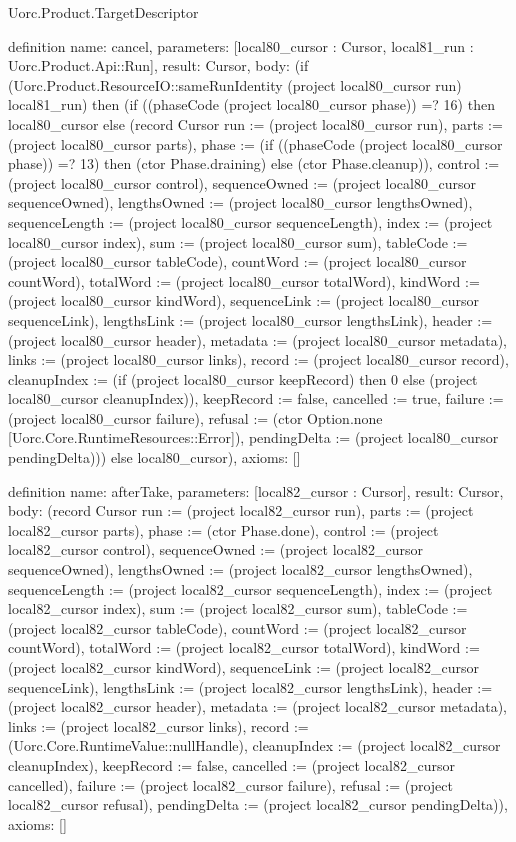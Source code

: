 \begin{lexlean}{Uorc.Product.TargetDescriptor}
\begin{semanticmodule}
definition{
  name: cancel,
  parameters: [local80_cursor : Cursor, local81_run : Uorc.Product.Api::Run],
  result: Cursor,
  body: (if (Uorc.Product.ResourceIO::sameRunIdentity (project local80_cursor run) local81_run) then (if ((phaseCode (project local80_cursor phase)) =? 16) then local80_cursor else (record Cursor {run := (project local80_cursor run), parts := (project local80_cursor parts), phase := (if ((phaseCode (project local80_cursor phase)) =? 13) then (ctor Phase.draining) else (ctor Phase.cleanup)), control := (project local80_cursor control), sequenceOwned := (project local80_cursor sequenceOwned), lengthsOwned := (project local80_cursor lengthsOwned), sequenceLength := (project local80_cursor sequenceLength), index := (project local80_cursor index), sum := (project local80_cursor sum), tableCode := (project local80_cursor tableCode), countWord := (project local80_cursor countWord), totalWord := (project local80_cursor totalWord), kindWord := (project local80_cursor kindWord), sequenceLink := (project local80_cursor sequenceLink), lengthsLink := (project local80_cursor lengthsLink), header := (project local80_cursor header), metadata := (project local80_cursor metadata), links := (project local80_cursor links), record := (project local80_cursor record), cleanupIndex := (if (project local80_cursor keepRecord) then 0 else (project local80_cursor cleanupIndex)), keepRecord := false, cancelled := true, failure := (project local80_cursor failure), refusal := (ctor Option.none [Uorc.Core.RuntimeResources::Error]), pendingDelta := (project local80_cursor pendingDelta)})) else local80_cursor),
  axioms: []
}

definition{
  name: afterTake,
  parameters: [local82_cursor : Cursor],
  result: Cursor,
  body: (record Cursor {run := (project local82_cursor run), parts := (project local82_cursor parts), phase := (ctor Phase.done), control := (project local82_cursor control), sequenceOwned := (project local82_cursor sequenceOwned), lengthsOwned := (project local82_cursor lengthsOwned), sequenceLength := (project local82_cursor sequenceLength), index := (project local82_cursor index), sum := (project local82_cursor sum), tableCode := (project local82_cursor tableCode), countWord := (project local82_cursor countWord), totalWord := (project local82_cursor totalWord), kindWord := (project local82_cursor kindWord), sequenceLink := (project local82_cursor sequenceLink), lengthsLink := (project local82_cursor lengthsLink), header := (project local82_cursor header), metadata := (project local82_cursor metadata), links := (project local82_cursor links), record := (Uorc.Core.RuntimeValue::nullHandle), cleanupIndex := (project local82_cursor cleanupIndex), keepRecord := false, cancelled := (project local82_cursor cancelled), failure := (project local82_cursor failure), refusal := (project local82_cursor refusal), pendingDelta := (project local82_cursor pendingDelta)}),
  axioms: []
}


\end{semanticmodule}
\end{lexlean}
